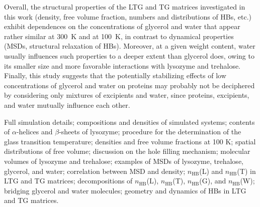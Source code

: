 \documentclass[journal=jpcbfk,manuscript=article]{achemso}
\begin{document}
\begin{singlespacing}
Overall, the structural properties of the LTG and TG matrices investigated in this work (density, free volume fraction, 
numbers and distributions of HBs, etc.) exhibit dependences on the concentrations of glycerol and water that appear rather
similar at 300~K and at 100~K, in contrast to dynamical properties (MSDs, structural relaxation of HBs). Moreover, 
at a given weight content, water usually influences such properties to a deeper extent than glycerol does, owing to its 
smaller size and more favorable interactions with lysozyme and trehalose. Finally, this study suggests that the potentially 
stabilizing effects of low concentrations of glycerol and water on proteins may probably not be deciphered by considering only 
mixtures of excipients and water, since proteins, excipients, and water mutually influence each other.


\begin{suppinfo}
Full simulation details; compositions and densities of simulated systems; contents of $\alpha$-helices and $\beta$-sheets of lysozyme; 
procedure for the determination of the glass transition temperature; densities and free volume fractions at 100 K; 
spatial distributions of free volume; discussion on the hole filling mechanism; 
molecular volumes of lysozyme and trehalose; examples of MSDs of lysozyme, trehalose, glycerol, 
and water; correlation between MSD and density; $n_{\textrm{HB}}$(L) and $n_{\textrm{HB}}$(T) in LTG and TG matrices; 
decompositions of $n_{\textrm{HB}}$(L), $n_{\textrm{HB}}$(T), $n_{\textrm{HB}}$(G), and $n_{\textrm{HB}}$(W); 
bridging glycerol and water molecules; geometry and dynamics of HBs in LTG and TG matrices.\\
\end{suppinfo}

\acknowledgement


\end{singlespacing}
\end{document}
